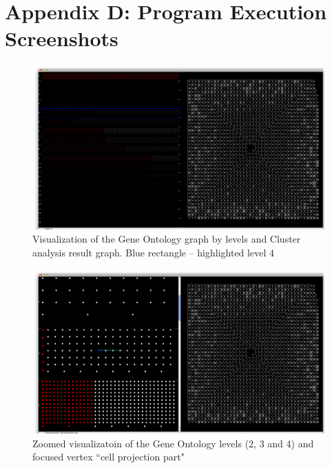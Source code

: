 \section*{Appendix D: Program Execution Screenshots}
\label{sec:appendix_D}

\begin{figure}[h!]
\centering
\includegraphics[scale=0.27, angle=90]{pictures/screenshot_1.png}
\caption{Visualization of the Gene Ontology graph by levels and Cluster analysis result graph. Blue rectangle -- highlighted level 4}
\end{figure}

\newpage
\begin{figure}[h!]
\centering
\includegraphics[scale=0.33, angle=90]{pictures/screenshot_2.png}
\caption{Zoomed visualizatoin of the Gene Ontology levels (2, 3 and 4) and focused vertex ``cell projection part"}
\end{figure}


